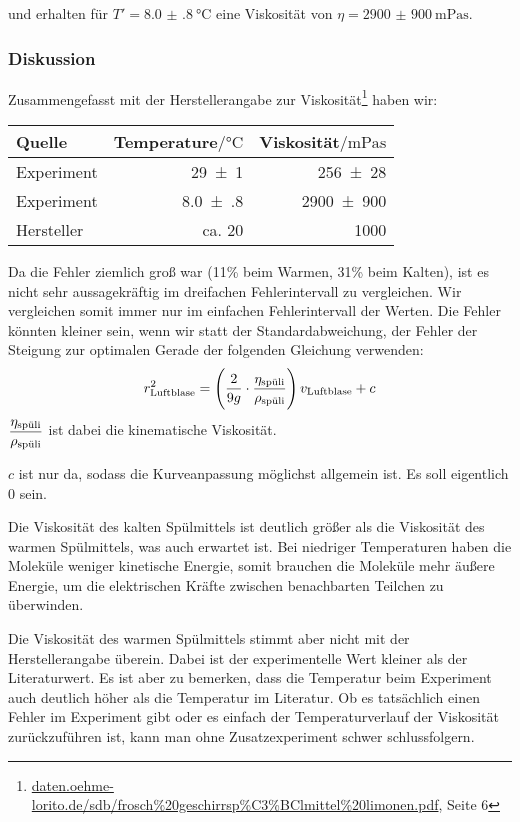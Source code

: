 		 und erhalten für $T' = \SI{8.0(8)}{\celsius}$ eine Viskosität von $\eta = \SI{2900(900)}{\milli\pascal\second}$.

	\subsubsection{Diskussion}
		Zusammengefasst mit der Herstellerangabe zur Viskosität\footnote{\url{daten.oehme-lorito.de/sdb/frosch\%20geschirrsp\%C3\%BClmittel\%20limonen.pdf}, Seite 6} haben wir:
		\begin{center}
			\begin{tabular}{lrr}
				\toprule
				Quelle & Temperature$/\si{\celsius}$ & Viskosität$/\si{\milli\pascal\second}$ \\
				\midrule
				Experiment & \num{29(1)} & \num{256(28)} \\
				Experiment & \num{8.0(8)} & \num{2900(900)} \\
				Hersteller & ca. \num{20} & \num{1000} \\
				\bottomrule
			\end{tabular}
		\end{center}
		Da die Fehler ziemlich groß war (11\% beim Warmen, 31\% beim Kalten), ist es nicht sehr aussagekräftig im dreifachen Fehlerintervall zu vergleichen. Wir vergleichen somit immer nur im einfachen Fehlerintervall der Werten. Die Fehler könnten kleiner sein, wenn wir statt der Standardabweichung, der Fehler der Steigung zur optimalen Gerade der folgenden Gleichung verwenden:
		\begin{equation}
			r^2_\text{Luftblase} = \left(\frac{2}{9g}\cdot \frac{\eta_\spuli}{\rho_\spuli}\right)v_\text{Luftblase} + c
		\end{equation}
		$\displaystyle \frac{\eta_\spuli}{\rho_\spuli}$ ist dabei die kinematische Viskosität.

		$c$ ist nur da, sodass die Kurveanpassung möglichst allgemein ist. Es soll eigentlich $0$ sein. 

		Die Viskosität des kalten Spülmittels ist deutlich größer als die Viskosität des warmen Spülmittels, was auch erwartet ist. Bei niedriger Temperaturen haben die Moleküle weniger kinetische Energie, somit brauchen die Moleküle mehr äußere Energie, um die elektrischen Kräfte zwischen benachbarten Teilchen zu überwinden.

		Die Viskosität des warmen Spülmittels stimmt aber nicht mit der Herstellerangabe überein. Dabei ist der experimentelle Wert kleiner als der Literaturwert. Es ist aber zu bemerken, dass die Temperatur beim Experiment auch deutlich höher als die Temperatur im Literatur. Ob es tatsächlich einen Fehler im Experiment gibt oder es einfach der Temperaturverlauf der Viskosität zurückzuführen ist, kann man ohne Zusatzexperiment schwer schlussfolgern. 


